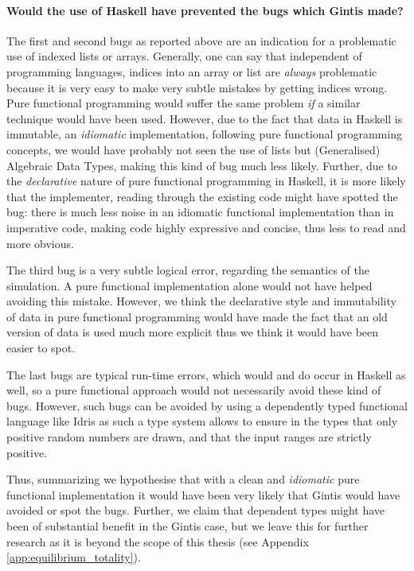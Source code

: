\paragraph{Would the use of Haskell have prevented the bugs which Gintis made?}
The first and second bugs as reported above are an indication for a problematic use of indexed lists or arrays. Generally, one can say that independent of programming languages, indices into an array or list are \textit{always} problematic because it is very easy to make very subtle mistakes by getting indices wrong. Pure functional programming would suffer the same problem \textit{if} a similar technique would have been used. However, due to the fact that data in Haskell is immutable, an \textit{idiomatic} implementation, following pure functional programming concepts, we would have probably not seen the use of lists but (Generalised) Algebraic Data Types, making this kind of bug much less likely. Further, due to the \textit{declarative} nature of pure functional programming in Haskell, it is more likely that the implementer, reading through the existing code might have spotted the bug: there is much less noise in an idiomatic functional implementation than in imperative code, making code highly expressive and concise, thus less to read and more obvious.

The third bug is a very subtle logical error, regarding the semantics of the simulation. A pure functional implementation alone would not have helped avoiding this mistake. However, we think the declarative style and immutability of data in pure functional programming would have made the fact that an old version of data is used much more explicit thus we think it would have been easier to spot.

The last bugs are typical run-time errors, which would and do occur in Haskell as well, so a pure functional approach would not necessarily avoid these kind of bugs. However, such bugs can be avoided by using a dependently typed functional language like Idris \cite{brady_idris_2013} as such a type system allows to ensure in the types that only positive random numbers are drawn, and that the input ranges are strictly positive.

Thus, summarizing we hypothesise that with a clean and \textit{idiomatic} pure functional implementation it would have been very likely that Gintis would have avoided or spot the bugs. Further, we claim that dependent types might have been of substantial benefit in the Gintis case, but we leave this for further research as it is beyond the scope of this thesis (see Appendix \ref{app:equilibrium_totality}).

